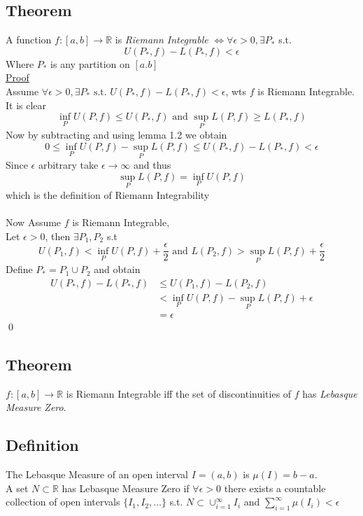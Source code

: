 \documentclass[a4paper, 12pt, twoside]{article}
\begin{document}
        \subsection{Theorem}
            A function $f:[a,b] \to  \mathbb{R}$ is \emph{Riemann Integrable} $\iff \forall \epsilon>0, \exists P_{*}$ s.t.
            $$ U(P_{*},f)-L(P_{*},f)<\epsilon$$
            Where $P_{*}$ is any partition on $[a.b]$\\
            \underline{Proof}\\
            Assume $ \forall \epsilon>0, \exists P_{*} \text{ s.t. }  U(P_{*},f)-L(P_{*},f)<\epsilon$, wts $f$ is Riemann Integrable.\\
            It is clear
            $$ \inf_{P}U(P,f)\leq U(P_{*},f) \text{ and } \sup_{P}L(P,f)\geq L(P_{*},f)$$
            Now by subtracting and using lemma 1.2 we obtain
            $$ 0\leq  \inf_{P}U(P,f)-\sup_{P}L(P,f) \leq U(P_{*},f)- L(P_{*},f) < \epsilon$$
            Since $\epsilon$ arbitrary take $\epsilon\to\infty$ and thus
            $$ \sup_{P}L(P,f) = \inf_{P}U(P,f) $$
            which is the definition of Riemann Integrability\\\\
            Now Assume $f$ is Riemann Integrable,\\
            Let $\epsilon>0$, then $\exists P_{1},P_{2}$ s.t
            $$U(P_{1},f) < \inf_{P}U(P,f) + \frac{\epsilon}{2} \text{ and } L(P_{2},f) > \sup_{P}L(P,f) + \frac{\epsilon}{2}$$
            Define $P_{*}=P_{1}\cup P_{2}$ and obtain
            \begin{align*}
                 U(P_{*},f)-L(P_{*},f) &\leq U(P_{1},f) - L(P_{2},f)\\
                &< \inf_{P}U(P,f)-\sup_{P}L(P,f)+\epsilon \\
                &= \epsilon
            \end{align*}
            \qed
        \subsection{Theorem}
            $f:[a,b] \to  \mathbb{R}$ is Riemann Integrable iff the set of discontinuities of $f$ has \emph{Lebasque Measure Zero}.
        \subsection{Definition}
            The Lebasque Measure of an open interval $I=(a,b)$ is $\mu(I)=b-a$.\\
            A set $N\subset \mathbb{R}$ has Lebasque Measure Zero if $\forall \epsilon > 0$ there exists a countable collection of open intervals $\{I_{1},I_{2},\dots\}$ s.t. $ N\subset \cup_{i=1}^{\infty}I_{i}$ and $\sum_{i=1}^{\infty}\mu(I_{i})<\epsilon$
\end{document}
